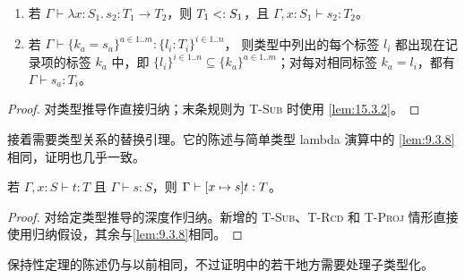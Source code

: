 \taplstatementliststart
\begin{lemma}
\label{lem:15.3.3}
\taplstatementlistbreak
\begin{enumerate}
\item 若 \(\Gamma\vdash\lambda x:S_1.\,s_2:T_1\to T_2\)，则
  \(T_1\mathrel{<:} S_1\)，且 \(\Gamma,x:S_1\vdash s_2:T_2\)。
\item 若
  \(\Gamma\vdash\{k_a=s_a\}^{a\in1..m}:\{l_i:T_i\}^{i\in1..n}\)，
  则类型中列出的每个标签 \(l_i\) 都出现在记录项的标签 \(k_a\) 中，即
  \(\{l_i\}^{i\in1..n}\subseteq\{k_a\}^{a\in1..m}\)；对每对相同标签
  \(k_a=l_i\)，都有 \(\Gamma\vdash s_a:T_i\)。
\end{enumerate}
\end{lemma}
\begin{proof}
对类型推导作直接归纳；末条规则为 \textsc{T-Sub} 时使用
\cref{lem:15.3.2}。
\end{proof}

接着需要类型关系的替换引理。它的陈述与简单类型 lambda 演算中的
\cref{lem:9.3.8}相同，证明也几乎一致。

\begin{lemma}[替换]
\label{lem:15.3.4}
若 \(\Gamma,x:S\vdash t:T\) 且 \(\Gamma\vdash s:S\)，则
\(\Gamma\vdash[x\mapsto s]t:T\)。
\end{lemma}
\begin{proof}
对给定类型推导的深度作归纳。新增的 \textsc{T-Sub}、\textsc{T-Rcd} 和
\textsc{T-Proj} 情形直接使用归纳假设，其余与\cref{lem:9.3.8}相同。
\end{proof}

保持性定理的陈述仍与以前相同，不过证明中的若干地方需要处理子类型化。

